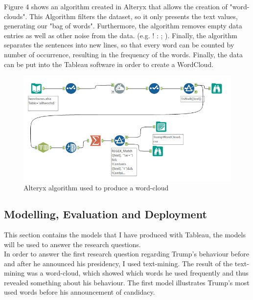 \documentclass[12pt]{article}
\begin{document}
Figure 4 shows an algorithm created in Alteryx that allows the creation of "word-clouds". This Algorithm filters the dataset, so it only presents the text values, generating our "bag of words". Furthermore, the algorithm removes empty data entries as well as other noise from the data. (e.g. ! : ; ). Finally, the algorithm separates the sentences into new lines, so that every word can be counted by number of occurrence, resulting in the frequency of the words. Finally, the data can be put into the Tableau software in order to create a WordCloud.


\begin{figure}[H] %
	\centering %
\includegraphics [scale= .65]  {TrumpWordCloudAlteryxFinal.PNG}    %
	\caption[Optional caption] {Alteryx algorithm used to produce a word-cloud}
	\label{fig:wordcloudBliz}

\end{figure}

\subsection{Modelling, Evaluation and Deployment}
This section contains the models that I have produced with Tableau, the models will be used to answer the research questions. \\

In order to answer the first research question regarding Trump's behaviour before and after he announced his presidency, I used text-mining. The result of the text-mining was a word-cloud, which showed which words he used frequently and thus revealed something about his behaviour. The first model illustrates Trump's most used words before his announcement of candidacy.
\end{document}
